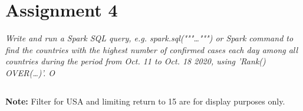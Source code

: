 \documentclass[]{article}
\begin{document}
\section*{Assignment 4}
\emph{ Write and run a Spark SQL query, e.g. spark.sql("""\ldots""") or Spark command to find the 	countries with the highest number of confirmed cases each day among all countries during the period from Oct. 11 to Oct. 18 2020, using 'Rank() OVER(\ldots)'. O }

\begin{verbatim}

\end{verbatim}
\textbf{Note:} Filter for USA and limiting return to 15 are for display purposes only.
\end{document}
